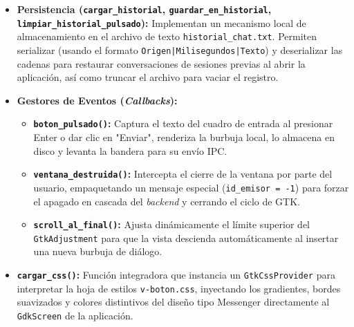 \begin{itemize}
    \item \textbf{Persistencia (\texttt{cargar\_historial}, \texttt{guardar\_en\_historial}, \texttt{limpiar\_historial\_pulsado}):} Implementan un mecanismo local de almacenamiento en el archivo de texto \texttt{historial\_chat.txt}. Permiten serializar (usando el formato \texttt{Origen|Milisegundos|Texto}) y deserializar las cadenas para restaurar conversaciones de sesiones previas al abrir la aplicación, así como truncar el archivo para vaciar el registro.
    
    \item \textbf{Gestores de Eventos (\textit{Callbacks}):} 
    \begin{itemize}
        \item \textbf{\texttt{boton\_pulsado()}:} Captura el texto del cuadro de entrada al presionar Enter o dar clic en "Enviar", renderiza la burbuja local, lo almacena en disco y levanta la bandera para su envío IPC.
        \item \textbf{\texttt{ventana\_destruida()}:} Intercepta el cierre de la ventana por parte del usuario, empaquetando un mensaje especial (\texttt{id\_emisor = -1}) para forzar el apagado en cascada del \textit{backend} y cerrando el ciclo de GTK.
        \item \textbf{\texttt{scroll\_al\_final()}:} Ajusta dinámicamente el límite superior del \texttt{GtkAdjustment} para que la vista descienda automáticamente al insertar una nueva burbuja de diálogo.
    \end{itemize}
    
    \item \textbf{\texttt{cargar\_css()}:} Función integradora que instancia un \texttt{GtkCssProvider} para interpretar la hoja de estilos \texttt{v-boton.css}, inyectando los gradientes, bordes suavizados y colores distintivos del diseño tipo Messenger directamente al \texttt{GdkScreen} de la aplicación.
\end{itemize}

